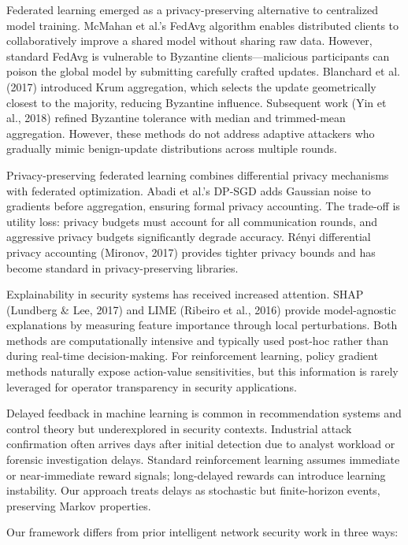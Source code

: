 \documentclass[preprint,12pt]{elsarticle}
\begin{document}
Federated learning emerged as a privacy-preserving alternative to centralized model training. McMahan et al.'s FedAvg algorithm enables distributed clients to collaboratively improve a shared model without sharing raw data. However, standard FedAvg is vulnerable to Byzantine clients---malicious participants can poison the global model by submitting carefully crafted updates. Blanchard et al. (2017) introduced Krum aggregation, which selects the update geometrically closest to the majority, reducing Byzantine influence. Subsequent work (Yin et al., 2018) refined Byzantine tolerance with median and trimmed-mean aggregation. However, these methods do not address adaptive attackers who gradually mimic benign-update distributions across multiple rounds.

Privacy-preserving federated learning combines differential privacy mechanisms with federated optimization. Abadi et al.'s DP-SGD adds Gaussian noise to gradients before aggregation, ensuring formal privacy accounting. The trade-off is utility loss: privacy budgets must account for all communication rounds, and aggressive privacy budgets significantly degrade accuracy. Rényi differential privacy accounting (Mironov, 2017) provides tighter privacy bounds and has become standard in privacy-preserving libraries.

Explainability in security systems has received increased attention. SHAP (Lundberg \& Lee, 2017) and LIME (Ribeiro et al., 2016) provide model-agnostic explanations by measuring feature importance through local perturbations. Both methods are computationally intensive and typically used post-hoc rather than during real-time decision-making. For reinforcement learning, policy gradient methods naturally expose action-value sensitivities, but this information is rarely leveraged for operator transparency in security applications.

Delayed feedback in machine learning is common in recommendation systems and control theory but underexplored in security contexts. Industrial attack confirmation often arrives days after initial detection due to analyst workload or forensic investigation delays. Standard reinforcement learning assumes immediate or near-immediate reward signals; long-delayed rewards can introduce learning instability. Our approach treats delays as stochastic but finite-horizon events, preserving Markov properties.

Our framework differs from prior intelligent network security work in three ways:
\end{document}
